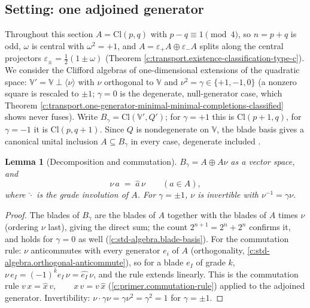 \documentclass[11pt]{article}
\newtheorem{lemma}[theorem]{Lemma}
\theoremstyle{definition}
\theoremstyle{plain}
\providecommand{\Cl}{}\renewcommand{\Cl}{\mathrm{Cl}}
\begin{document}
\subsection*{Setting: one adjoined generator}
\label{c:note.transport.setting-setting-one-adjoined-generator}
Throughout this section $A = \Cl(p,q)$ with $p - q \equiv 1 \pmod 4$, so $n = p + q$ is odd, $\omega$ is central with $\omega^2 = +1$, and $A = \varepsilon_+ A \oplus \varepsilon_- A$ splits along the central projectors $\varepsilon_\pm = \tfrac12(1 \pm \omega)$ (Theorem \ref{c:transport.existence-classification-type-c}). We consider the Clifford algebras of one-dimensional extensions of the quadratic space: $\mathbb{V}' = \mathbb{V} \perp \langle \nu \rangle$ with $\nu$ orthogonal to $\mathbb{V}$ and $\nu^2 = \gamma \in \{+1, -1, 0\}$ (a nonzero square is rescaled to $\pm 1$; $\gamma = 0$ is the degenerate, null-generator case, which Theorem \ref{c:transport.one-generator-minimal-minimal-completions-classified} shows never fuses). Write $B_\gamma = \Cl(\mathbb{V}', Q')$; for $\gamma = +1$ this is $\Cl(p{+}1, q)$, for $\gamma = -1$ it is $\Cl(p, q{+}1)$. Since $Q$ is nondegenerate on $\mathbb{V}$, the blade basis gives a canonical unital inclusion $A \subseteq B_\gamma$ in every case, degenerate included \cite{Chevalley1997}.

\begin{lemma}[Decomposition and commutation]\label{c:transport.decomposition-commutation}
$B_\gamma = A \oplus A\nu$ as a vector space, and
\[
\nu\, a \;=\; \hat{a}\, \nu \qquad (a \in A),
\]
where $\hat{\cdot}$ is the grade involution of $A$. For $\gamma = \pm 1$, $\nu$ is invertible with $\nu^{-1} = \gamma\nu$.
\end{lemma}
\begin{proof}
The blades of $B_\gamma$ are the blades of $A$ together with the blades of $A$ times $\nu$ (ordering $\nu$ last), giving the direct sum; the count $2^{n+1} = 2^n + 2^n$ confirms it, and holds for $\gamma = 0$ as well \cite{Chevalley1997} (\ref{c:std-algebra.blade-basis}). For the commutation rule: $\nu$ anticommutes with every generator $e_i$ of $A$ (orthogonality, \ref{c:std-algebra.orthogonal-anticommute}), so for a blade $e_I$ of grade $k$, $\nu\, e_I = (-1)^k e_I\, \nu = \hat{e_I}\,\nu$, and the rule extends linearly. This is the commutation rule $v\,x = \hat{x}\,v, \qquad x\,v = v\,\hat{x}$ (\ref{c:primer.commutation-rule}) applied to the adjoined generator. Invertibility: $\nu \cdot \gamma\nu = \gamma \nu^2 = \gamma^2 = 1$ for $\gamma = \pm 1$.

\end{proof}
\end{document}
